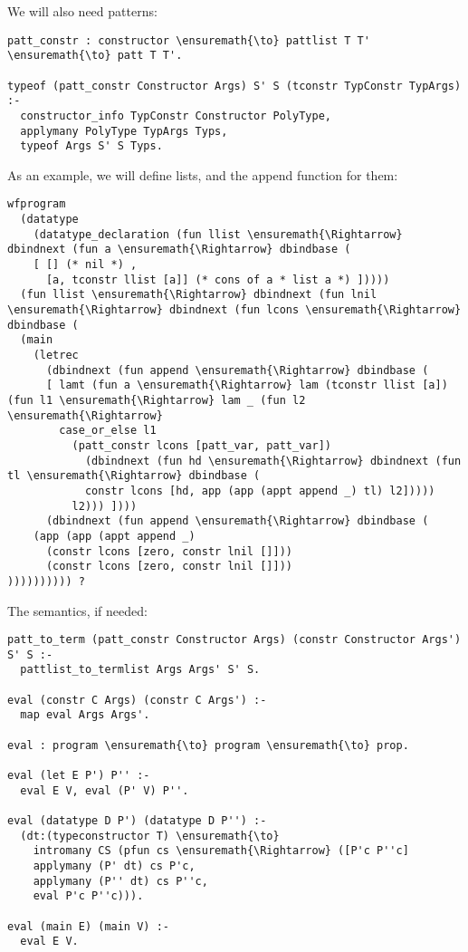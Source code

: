 We will also need patterns:

\begin{verbatim}
patt_constr : constructor \ensuremath{\to} pattlist T T' \ensuremath{\to} patt T T'.

typeof (patt_constr Constructor Args) S' S (tconstr TypConstr TypArgs) :-
  constructor_info TypConstr Constructor PolyType,
  applymany PolyType TypArgs Typs,
  typeof Args S' S Typs.
\end{verbatim}

As an example, we will define lists, and the append function for them:

\begin{verbatim}
wfprogram
  (datatype
    (datatype_declaration (fun llist \ensuremath{\Rightarrow} dbindnext (fun a \ensuremath{\Rightarrow} dbindbase (
    [ [] (* nil *) ,
      [a, tconstr llist [a]] (* cons of a * list a *) ]))))
  (fun llist \ensuremath{\Rightarrow} dbindnext (fun lnil \ensuremath{\Rightarrow} dbindnext (fun lcons \ensuremath{\Rightarrow} dbindbase (
  (main
    (letrec
      (dbindnext (fun append \ensuremath{\Rightarrow} dbindbase (
      [ lamt (fun a \ensuremath{\Rightarrow} lam (tconstr llist [a]) (fun l1 \ensuremath{\Rightarrow} lam _ (fun l2 \ensuremath{\Rightarrow}
        case_or_else l1
          (patt_constr lcons [patt_var, patt_var])
            (dbindnext (fun hd \ensuremath{\Rightarrow} dbindnext (fun tl \ensuremath{\Rightarrow} dbindbase (
            constr lcons [hd, app (app (appt append _) tl) l2]))))
          l2))) ])))
      (dbindnext (fun append \ensuremath{\Rightarrow} dbindbase (
    (app (app (appt append _)
      (constr lcons [zero, constr lnil []]))
      (constr lcons [zero, constr lnil []]))
)))))))))) ?
\end{verbatim}

The semantics, if needed:

\begin{verbatim}
patt_to_term (patt_constr Constructor Args) (constr Constructor Args') S' S :-
  pattlist_to_termlist Args Args' S' S.

eval (constr C Args) (constr C Args') :-
  map eval Args Args'.

eval : program \ensuremath{\to} program \ensuremath{\to} prop.

eval (let E P') P'' :-
  eval E V, eval (P' V) P''.

eval (datatype D P') (datatype D P'') :-
  (dt:(typeconstructor T) \ensuremath{\to}
    intromany CS (pfun cs \ensuremath{\Rightarrow} ([P'c P''c]
    applymany (P' dt) cs P'c,
    applymany (P'' dt) cs P''c,
    eval P'c P''c))).

eval (main E) (main V) :-
  eval E V.
\end{verbatim}

